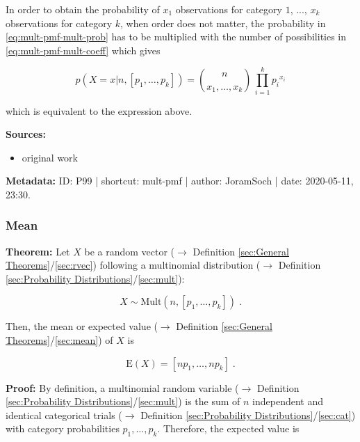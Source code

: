 \documentclass[a4paper,12pt,twoside]{book}
\begin{document}
In order to obtain the probability of $x_1$ observations for category $1$, ..., $x_k$ observations for category $k$, when order does not matter, the probability in \eqref{eq:mult-pmf-mult-prob} has to be multiplied with the number of possibilities in \eqref{eq:mult-pmf-mult-coeff} which gives

\begin{equation} \label{eq:mult-pmf-mult-pmf-qed}
p(X=x|n,\left[p_1, \ldots, p_k \right]) = {n \choose {x_1, \ldots, x_k}} \, \prod_{i=1}^k {p_i}^{x_i}
\end{equation}

which is equivalent to the expression above.


\vspace{1em}
\textbf{Sources:}
\begin{itemize}
\item original work\end{itemize}


\vspace{1em}
\textbf{Metadata:} ID: P99 | shortcut: mult-pmf | author: JoramSoch | date: 2020-05-11, 23:30.
\vspace{1em}



\subsubsection[\textbf{Mean}]{Mean} \label{sec:mult-mean}
\setcounter{equation}{0}

\textbf{Theorem:} Let $X$ be a random vector ($\rightarrow$ Definition \ref{sec:General Theorems}/\ref{sec:rvec}) following a multinomial distribution ($\rightarrow$ Definition \ref{sec:Probability Distributions}/\ref{sec:mult}):

\begin{equation} \label{eq:mult-mean-mult}
X \sim \mathrm{Mult}(n,\left[p_1, \ldots, p_k \right]) \; .
\end{equation}

Then, the mean or expected value ($\rightarrow$ Definition \ref{sec:General Theorems}/\ref{sec:mean}) of $X$ is

\begin{equation} \label{eq:mult-mean-bin-mean}
\mathrm{E}(X) = \left[n p_1, \ldots, n p_k \right] \; .
\end{equation}


\vspace{1em}
\textbf{Proof:} By definition, a multinomial random variable ($\rightarrow$ Definition \ref{sec:Probability Distributions}/\ref{sec:mult}) is the sum of $n$ independent and identical categorical trials ($\rightarrow$ Definition \ref{sec:Probability Distributions}/\ref{sec:cat}) with category probabilities $p_1, \ldots, p_k$. Therefore, the expected value is
\end{document}
